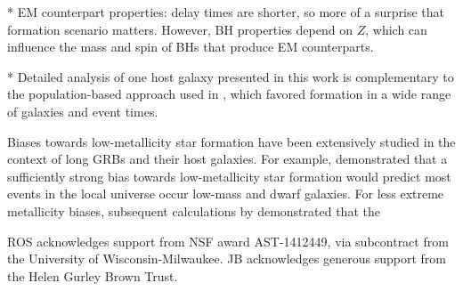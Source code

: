 \documentclass[nofootinbib,twocolumn,prd]{emulateapj}
\begin{document}
* EM counterpart properties: delay times are shorter, so more of a surprise that formation scenario matters.  However,
BH properties depend on $Z$, which can influence the mass and spin of BHs that produce EM counterparts.



* Detailed analysis of one host galaxy presented in this work is complementary to the population-based approach used in
\cite{2016arXiv160508783L}, which favored formation in a wide range of galaxies and event times.   %

Biases towards low-metallicity star formation have been extensively studied in the context of long GRBs and their host galaxies.
%
For example, \cite{2009ApJ...702..377K} demonstrated that a sufficiently strong bias towards low-metallicity star formation would predict
most  events in the local universe occur low-mass and dwarf galaxies.
For less extreme metallicity biases, subsequent calculations by  \citet{2011MNRAS.417..567N} demonstrated that the




\begin{acknowledgements}
ROS acknowledges support from NSF award AST-1412449, via subcontract from the University of Wisconsin-Milwaukee.
%
JB acknowledges generous support  from the Helen Gurley Brown Trust.
\end{acknowledgements}

\appendix







\end{document}
